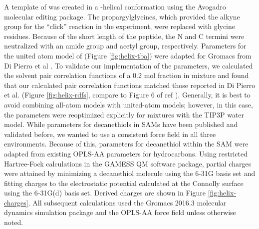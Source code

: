 A template of \pep{} was created in a \textalpha{}-helical conformation using the Avogadro molecular editing package\cite{Hanwell2012}.
The propargylglycines, which provided the alkyne group for the ``click'' reaction in the experiment, were replaced with glycine residues. 
Because of the short length of the peptide, the N and C termini were neutralized with an amide group and acetyl group, respectively. 
Parameters for the united atom model of \tba{} (Figure \ref{fig:helix-tba}) were adapted for Gromacs from Di Pierro et al \cite{DiPierro2015}.
To validate our implementation of the \tba{} parameters, we calculated the solvent pair correlation functions of a 0.2 mol fraction \tba{} in  mixture and found that our calculated pair correlation functions matched those reported in Di Pierro et al. (Figure \ref{fig:helix-rdfs}, compare to Figure 6 of ref ). 
Generally, it is best to avoid combining all-atom models with united-atom models; 
however, in this case, the \tba{} parameters were reoptimized explicitly for mixtures with the TIP3P water model. 
While parameters for decanethiols in SAMs have been published and validated before\cite{Godawat2009}, we wanted to use a consistent force field in all three environments. 
Because of this, parameters for decanethiol within the SAM were adapted from existing OPLS-AA parameters for hydrocarbons\cite{Kaminski1994}. 
Using restricted Hartree-Fock calculations in the GAMESS QM software package\cite{Schmidt1993, Gordon2005}, partial charges were attained by minimizing a decanethiol molecule using the 6-31G basis set and fitting charges to the electrostatic potential calculated at the Connolly surface using the 6-31G(d) basis set. 
Derived charges are shown in Figure \ref{fig:helix-charges}. 
All subsequent calculations used the Gromacs 2016.3 molecular dynamics simulation package\cite{Berendsen1995, Lindahl2001, VanDerSpoel2005, Hess2008, Pronk2013, Pall2015, Abraham2015} and the OPLS-AA force field\cite{Jorgensen1996, Kaminski2001} unless otherwise noted.

